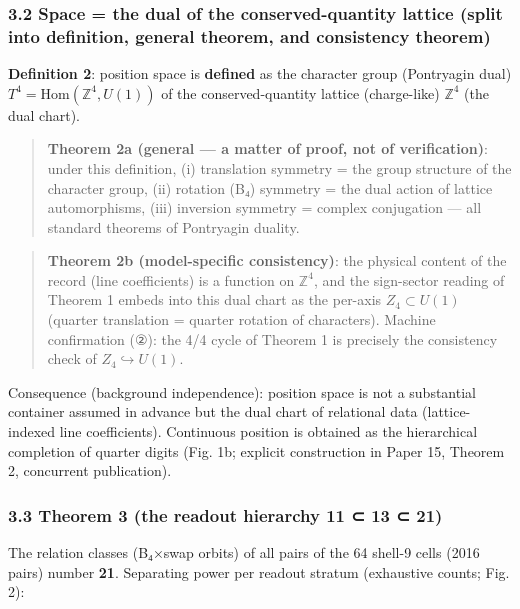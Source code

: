 \documentclass[
]{ltjsarticle}
\begin{document}
\subsubsection{3.2 Space = the dual of the conserved-quantity lattice
(split into definition, general theorem, and consistency
theorem)}\label{space-the-dual-of-the-conserved-quantity-lattice-split-into-definition-general-theorem-and-consistency-theorem}

\textbf{Definition 2}: position space is \textbf{defined} as the
character group (Pontryagin dual)
\(T^4=\mathrm{Hom}(\mathbb{Z}^4,U(1))\) of the conserved-quantity
lattice (charge-like) \(\mathbb{Z}^4\) (the dual chart).

\begin{quote}
\textbf{Theorem 2a (general --- a matter of proof, not of
verification)}: under this definition, (i) translation symmetry = the
group structure of the character group, (ii) rotation (B₄) symmetry =
the dual action of lattice automorphisms, (iii) inversion symmetry =
complex conjugation --- all standard theorems of Pontryagin duality.
\end{quote}

\begin{quote}
\textbf{Theorem 2b (model-specific consistency)}: the physical content
of the record (line coefficients) is a function on \(\mathbb{Z}^4\), and
the sign-sector reading of Theorem 1 embeds into this dual chart as the
per-axis \(Z_4\subset U(1)\) (quarter translation = quarter rotation of
characters). Machine confirmation (②): the 4/4 cycle of Theorem 1 is
precisely the consistency check of \(Z_4\hookrightarrow U(1)\).
\end{quote}

Consequence (background independence): position space is not a
substantial container assumed in advance but the dual chart of
relational data (lattice-indexed line coefficients). Continuous position
is obtained as the hierarchical completion of quarter digits (Fig. 1b;
explicit construction in Paper 15, Theorem 2, concurrent publication).

\subsubsection{3.3 Theorem 3 (the readout hierarchy 11 ⊂ 13 ⊂
21)}\label{theorem-3-the-readout-hierarchy-11-13-21}

The relation classes (B₄×swap orbits) of all pairs of the 64 shell-9
cells (2016 pairs) number \textbf{21}. Separating power per readout
stratum (exhaustive counts; Fig. 2):
\end{document}
